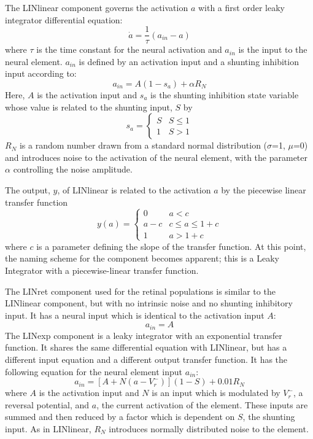\documentclass{frontiersSCNS}
\begin{document}
The LINlinear component governs the activation $a$ with a first order
leaky integrator differential equation:
\begin{equation}
   \dot{a} = \frac{1}{\tau}(a_{in}-a)
\end{equation}
where $\tau$ is the time constant for the neural activation and
$a_{in}$ is the input to the neural element. $a_{in}$ is defined by an
activation input and a shunting inhibition input according to:
\begin{equation}
   a_{in} = A(1-s_a)+\alpha R_N
\end{equation}
Here, $A$ is the activation input and $s_a$ is the shunting inhibition
state variable whose value is related to the shunting input, $S$ by
\begin{equation}
   s_a = \begin{cases}
      S & S\leq 1 \\
      1 & S > 1
   \end{cases}
\end{equation}
$R_N$ is a random number drawn from a standard normal distribution
($\sigma$=1, $\mu$=0) and introduces noise to the activation of the
neural element, with the parameter $\alpha$ controlling the noise
amplitude.

The output, $y$, of LINlinear is related to the activation $a$ by the
piecewise linear transfer function
\begin{equation}
   y(a) = \begin{cases}
      0   & a < c \\
      a-c & c \leq a \leq 1+c \\
      1   & a > 1+c
   \end{cases}
\end{equation}
where $c$ is a parameter defining the slope of the transfer
function. At this point, the naming scheme for the component becomes
apparent; this is a Leaky Integrator with a piecewise-linear transfer
function.

The LINret component used for the retinal populations is similar to
the LINlinear component, but with no intrinsic noise and no shunting
inhibitory input. It has a neural input which is identical to the
activation input $A$:
\begin{equation}
   a_{in} = A
\end{equation}
The LINexp component is a leaky integrator with an exponential
transfer function. It shares the same differential equation with
LINlinear, but has a different input equation and a different output
transfer function. It has the following equation for the neural
element input $a_{in}$:
\begin{equation}
   a_{in} = [A+N(a-V_{r}^{-})] (1-S) + 0.01 R_N
\end{equation}
where $A$ is the activation input and $N$ is an input which is
modulated by $V_{r}^{-}$, a reversal potential, and $a$, the current
activation of the element. These inputs are summed and then reduced by
a factor which is dependent on $S$, the shunting input. As in
LINlinear, $R_N$ introduces normally distributed noise to the element.
\end{document}
